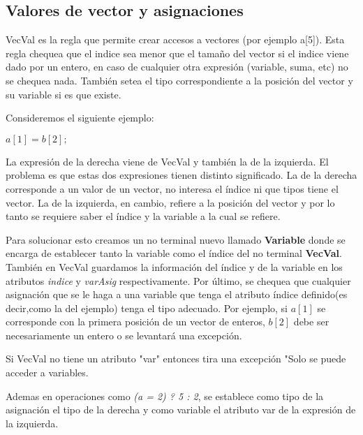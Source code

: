 \pagebreak
\subsection{Valores de vector y asignaciones}
VecVal es la regla que permite crear accesos a vectores (por ejemplo a[5]). Esta regla chequea que el indice sea menor que el tamaño del vector si el indice viene dado por un entero, en caso de cualquier otra expresión (variable, suma, etc) no se chequea nada. También setea el tipo correspondiente a la posición del vector y su variable si es que existe.

Consideremos el siguiente ejemplo:

$a[1] = b[2];$

La expresión de la derecha viene de VecVal y también la de la izquierda. El problema es que estas dos expresiones tienen distinto significado. La de la derecha corresponde a un valor de un vector, no interesa el índice ni que tipos tiene el vector. La de la izquierda, en cambio, refiere a la posición del vector y por lo tanto se requiere saber el índice y la variable a la cual se refiere.

Para solucionar esto creamos un no terminal nuevo llamado \textbf{Variable} donde se encarga de establecer tanto la variable como el índice del no terminal \textbf{VecVal}.
También en VecVal guardamos la información del índice y de la variable en los atributos \textit{indice} y \textit{varAsig} respectivamente.
Por último, se chequea que cualquier asignación que se le haga a una variable que tenga el atributo índice definido(es decir,como la del ejemplo) tenga el tipo adecuado.
Por ejemplo, si $a[1]$ se corresponde con la primera posición de un vector de enteros, $b[2]$ debe ser necesariamente un entero o se levantará una excepción.

Si VecVal no tiene un atributo "var" entonces tira una excepción "Solo se puede acceder a variables.

Ademas en operaciones como \textit{(a = 2) ? 5 : 2}, se establece como tipo de la asignación el tipo de la derecha y como variable el atributo var de la expresión de la izquierda.


